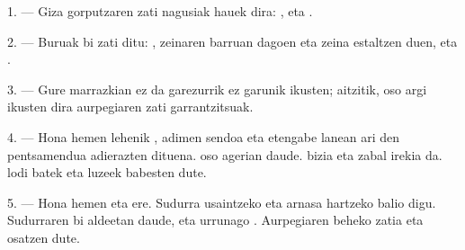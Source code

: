 %
%

\VUsaut{4.0mm}
\VUsaut{2.0mm}

\VUsaut{2.4mm}
\VUsaut{3.0mm}

1. --- Giza gorputzaren zati nagusiak hauek dira: ,
 eta .

\VUsaut{3.0mm}

2. --- Buruak bi zati ditu: , zeinaren barruan 
dagoen eta zeina  estaltzen duen, eta .

3. --- Gure marrazkian ez da garezurrik ez garunik ikusten; aitzitik, oso argi
ikusten dira aurpegiaren zati garrantzitsuak.

4. --- Hona hemen lehenik , adimen sendoa eta etengabe lanean ari
den pentsamendua adierazten dituena.  oso agerian daude.
 bizia eta zabal irekia da.  lodi batek eta
 luzeek babesten dute.

5. --- Hona hemen  eta  ere. Sudurra
usaintzeko eta arnasa hartzeko balio digu. Sudurraren bi aldeetan
 daude, eta urrunago . Aurpegiaren beheko
zatia  eta  osatzen dute.

